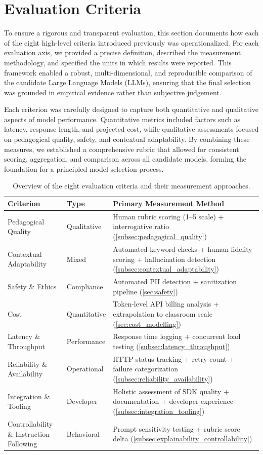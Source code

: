 \section{Evaluation Criteria}
\label{sec:evaluation_criteria}

To ensure a rigorous and transparent evaluation, this section documents how each of the eight high-level criteria introduced previously was operationalized. For each evaluation axis, we provided a precise definition, described the measurement methodology, and specified the units in which results were reported. This framework enabled a robust, multi-dimensional, and reproducible comparison of the candidate Large Language Models (LLMs), ensuring that the final selection was grounded in empirical evidence rather than subjective judgement.

Each criterion was carefully designed to capture both quantitative and qualitative aspects of model performance. Quantitative metrics included factors such as latency, response length, and projected cost, while qualitative assessments focused on pedagogical quality, safety, and contextual adaptability. By combining these measures, we established a comprehensive rubric that allowed for consistent scoring, aggregation, and comparison across all candidate models, forming the foundation for a principled model selection process.

\begin{table}[t]
\centering
\caption{Overview of the eight evaluation criteria and their measurement approaches.}
\label{tab:evaluation_overview}
\begin{tabularx}{\textwidth}{@{}l l X@{}}
\toprule
\textbf{Criterion} & \textbf{Type} & \textbf{Primary Measurement Method} \\ \midrule
Pedagogical Quality & Qualitative & Human rubric scoring (1--5 scale) + interrogative ratio (\cref{subsec:pedagogical_quality}) \\
Contextual Adaptability & Mixed & Automated keyword checks + human fidelity scoring + hallucination detection (\cref{subsec:contextual_adaptability}) \\
Safety \& Ethics & Compliance & Automated PII detection + sanitization pipeline (\cref{sec:safety}) \\
Cost & Quantitative & Token-level API billing analysis + extrapolation to classroom scale (\cref{sec:cost_modelling}) \\
Latency \& Throughput & Performance & Response time logging + concurrent load testing (\cref{subsec:latency_throughput}) \\
Reliability \& Availability & Operational & HTTP status tracking + retry count + failure categorization (\cref{subsec:reliability_availability}) \\
Integration \& Tooling & Developer & Holistic assessment of SDK quality + documentation + developer experience (\cref{subsec:integration_tooling}) \\
Controllability \& Instruction Following & Behavioral & Prompt sensitivity testing + rubric score delta (\cref{subsec:explainability_controllability}) \\ \bottomrule
\end{tabularx}
\end{table}


